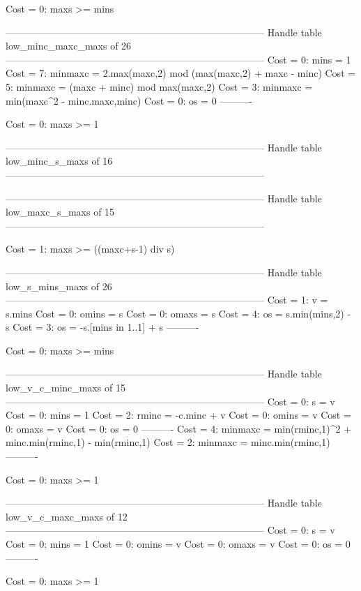 Cost =  0:  maxs >= mins

--------------------------------------------------------------------------------
Handle table low_minc_maxc_maxs of 26
--------------------------------------------------------------------------------
Cost =  0:  mins    = 1
Cost =  7:  minmaxc = 2.max(maxc,2) mod (max(maxc,2) + maxc - minc)
Cost =  5:  minmaxc = (maxc + minc) mod max(maxc,2)
Cost =  3:  minmaxc = min(maxc^2 - minc.maxc,minc)
Cost =  0:  os      = 0
----------

Cost =  0:  maxs >= 1

--------------------------------------------------------------------------------
Handle table low_minc_s_maxs of 16
--------------------------------------------------------------------------------


--------------------------------------------------------------------------------
Handle table low_maxc_s_maxs of 15
--------------------------------------------------------------------------------

Cost =  1:  maxs >= ((maxc+s-1) div s)

--------------------------------------------------------------------------------
Handle table low_s_mins_maxs of 26
--------------------------------------------------------------------------------
Cost =  1:  v     = s.mins
Cost =  0:  omins = s
Cost =  0:  omaxs = s
Cost =  4:  os    = s.min(mins,2) - s
Cost =  3:  os    = -s.[mins in 1..1] + s
----------

Cost =  0:  maxs >= mins

--------------------------------------------------------------------------------
Handle table low_v_c_minc_maxs of 15
--------------------------------------------------------------------------------
Cost =  0:  s       = v
Cost =  0:  mins    = 1
Cost =  2:  rminc   = -c.minc + v
Cost =  0:  omins   = v
Cost =  0:  omaxs   = v
Cost =  0:  os      = 0
----------
Cost =  4:  minmaxc = min(rminc,1)^2 + minc.min(rminc,1) - min(rminc,1)
Cost =  2:  minmaxc = minc.min(rminc,1)
----------

Cost =  0:  maxs >= 1

--------------------------------------------------------------------------------
Handle table low_v_c_maxc_maxs of 12
--------------------------------------------------------------------------------
Cost =  0:  s     = v
Cost =  0:  mins  = 1
Cost =  0:  omins = v
Cost =  0:  omaxs = v
Cost =  0:  os    = 0
----------

Cost =  0:  maxs >= 1

